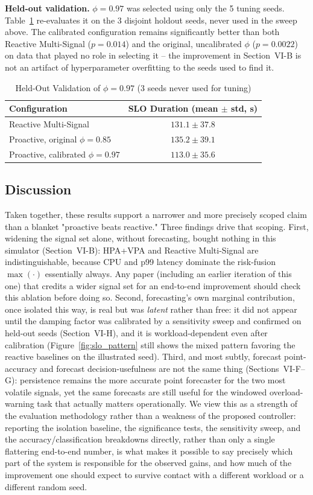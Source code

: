 \documentclass[conference]{IEEEtran}
\begin{document}
\textbf{Held-out validation.} $\phi=0.97$ was selected using only the 5 tuning seeds. Table~\ref{tab:holdout}
re-evaluates it on the 3 disjoint holdout seeds, never used in the sweep above. The calibrated
configuration remains significantly better than both Reactive Multi-Signal ($p=0.014$) and the original,
uncalibrated $\phi$ ($p=0.0022$) on data that played no role in selecting it -- the improvement in
Section~VI-B is not an artifact of hyperparameter overfitting to the seeds used to find it.

\begin{table}[t]
\centering
\caption{Held-Out Validation of $\phi=0.97$ (3 seeds never used for tuning)}
\label{tab:holdout}
\begin{tabular}{lc}
\toprule
Configuration & SLO Duration (mean $\pm$ std, s) \\
\midrule
Reactive Multi-Signal & $131.1 \pm 37.8$ \\
Proactive, original $\phi=0.85$ & $135.2 \pm 39.1$ \\
Proactive, calibrated $\phi=0.97$ & $\mathbf{113.0 \pm 35.6}$ \\
\bottomrule
\end{tabular}
\end{table}

\subsection{Discussion}
Taken together, these results support a narrower and more precisely scoped claim than a blanket
"proactive beats reactive." Three findings drive that scoping. First, widening the signal set alone,
without forecasting, bought nothing in this simulator (Section~VI-B): HPA+VPA and Reactive
Multi-Signal are indistinguishable, because CPU and p99 latency dominate the risk-fusion $\max(\cdot)$
essentially always. Any paper (including an earlier iteration of this one) that credits a wider signal
set for an end-to-end improvement should check this ablation before doing so. Second, forecasting's own
marginal contribution, once isolated this way, is real but was \emph{latent} rather than free: it did
not appear until the damping factor was calibrated by a sensitivity sweep and confirmed on held-out
seeds (Section~VI-H), and it is workload-dependent even after calibration (Figure~\ref{fig:slo_pattern}
still shows the mixed pattern favoring the reactive baselines on the illustrated seed). Third, and most
subtly, forecast point-accuracy and forecast decision-usefulness are not the same thing
(Sections~VI-F--G): persistence remains the more accurate point forecaster for the two most volatile
signals, yet the same forecasts are still useful for the windowed overload-warning task that actually
matters operationally. We view this as a strength of the evaluation methodology rather than a weakness
of the proposed controller: reporting the isolation baseline, the significance tests, the sensitivity
sweep, and the accuracy/classification breakdowns directly, rather than only a single flattering
end-to-end number, is what makes it possible to say precisely which part of the system is responsible
for the observed gains, and how much of the improvement one should expect to survive contact with a
different workload or a different random seed.
\end{document}
